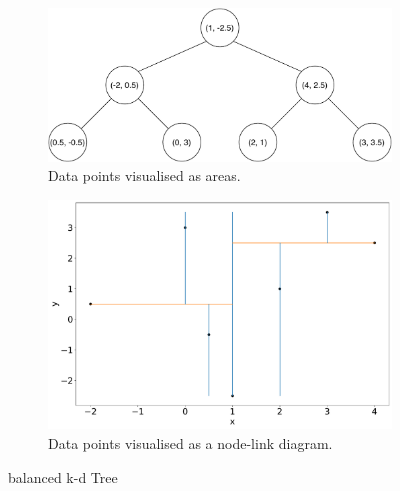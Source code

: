\documentclass[a4paper]{article}
\begin{document}
\begin{enumerate}
\begin{figure}
		\centering
	\begin{subfigure}[t]{.4\textwidth}
		\includegraphics[width=\textwidth]{kd-tree2.pdf}
		\caption{Data points visualised as areas.}
	\end{subfigure}
	\begin{subfigure}[t]{.4\textwidth}
		\includegraphics[width=\linewidth]{2dtree_nodelink2.pdf}
		\caption{Data points visualised as a node-link diagram.}
	\end{subfigure}
	\caption{balanced k-d Tree}
	\label{kdtree2}
\end{figure}
\end{enumerate}
\end{document}
